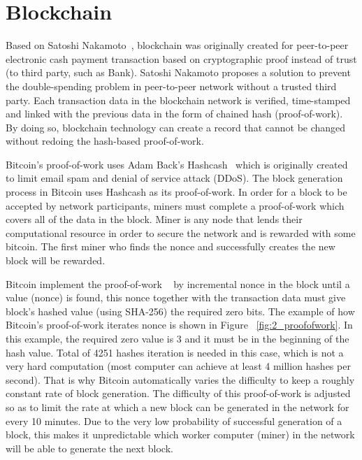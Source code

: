 \section{Blockchain}
\label{sec:2_blockchain}

Based on Satoshi Nakamoto~\cite{Satoshi}, blockchain was originally created for peer-to-peer electronic cash payment transaction based on cryptographic proof instead of trust (to third party, such as Bank). Satoshi Nakamoto proposes a solution to prevent the double-spending problem in peer-to-peer network without a trusted third party. Each transaction data in the blockchain network is verified, time-stamped and linked with the previous data in the form of chained hash (proof-of-work). By doing so, blockchain technology can create a record that cannot be changed without redoing the hash-based proof-of-work.

Bitcoin's proof-of-work uses Adam Back's Hashcash~\cite{hashcash} which is originally created to limit email spam and denial of service attack (DDoS). The block generation process in Bitcoin uses Hashcash as its proof-of-work. In order for a block to be accepted by network participants, miners must complete a proof-of-work which covers all of the data in the block. Miner is any node that lends their computational resource in order to secure the network and is rewarded with some bitcoin. The first miner who finds the nonce and successfully creates the new block will be rewarded.

Bitcoin implement the proof-of-work ~\cite{proofofwork} by incremental nonce in the block until a value (nonce) is found, this nonce together with the transaction data must give block's hashed value (using SHA-256) the required zero bits. The example of how Bitcoin's proof-of-work iterates nonce is shown in Figure ~\ref{fig:2_proofofwork}. In this example, the required zero value is 3 and it must be in the beginning of the hash value. Total of 4251 hashes iteration is needed in this case, which is not a very hard computation (most computer can achieve at least 4 million hashes per second). That is why Bitcoin automatically varies the difficulty to keep a roughly constant rate of block generation. The difficulty of this proof-of-work is adjusted so as to limit the rate at which a new block can be generated in the network for every 10 minutes. Due to the very low probability of successful generation of a block, this makes it unpredictable which worker computer (miner) in the network will be able to generate the next block.

